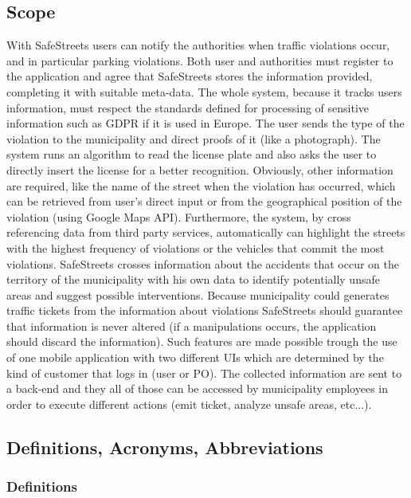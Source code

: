 \documentclass{article}
\begin{document}
\subsection{Scope}
With SafeStreets users can notify the authorities when traffic violations occur,
and in particular parking violations. Both user and authorities must register to
the application and agree that SafeStreets stores the information provided,
completing it with suitable meta-data. The whole system, because it tracks users
information, must respect the standards defined for processing of sensitive
information such as GDPR if it is used in Europe. The user sends the type of the
violation to the municipality and direct proofs of it (like a photograph). The
system runs an algorithm to read the license plate and also asks the user to
directly insert the license for a better recognition. Obviously, other
information are required, like the name of the street when the violation has
occurred, which can be retrieved from user's direct input or from the
geographical position of the violation (using Google Maps API). Furthermore, the
system, by cross referencing data from third party services, automatically can
highlight the streets with the highest frequency of violations or the vehicles
that commit the most violations. SafeStreets crosses information about the
accidents that occur on the territory of the municipality with his own data to
identify potentially unsafe areas and suggest possible interventions. Because
municipality could generates traffic tickets from the information about
violations SafeStreets should guarantee that information is never altered (if a
manipulations occurs, the application should discard the information). Such
features are made possible trough the use of one mobile application with two
different UIs which are determined by the kind of customer that logs in (user or
PO). The collected information are sent to a back-end and they all of those can
be accessed by municipality employees in order to execute different actions
(emit ticket, analyze unsafe areas, etc...).
\subsection{Definitions, Acronyms, Abbreviations}
\subsubsection{Definitions}
\end{document}
